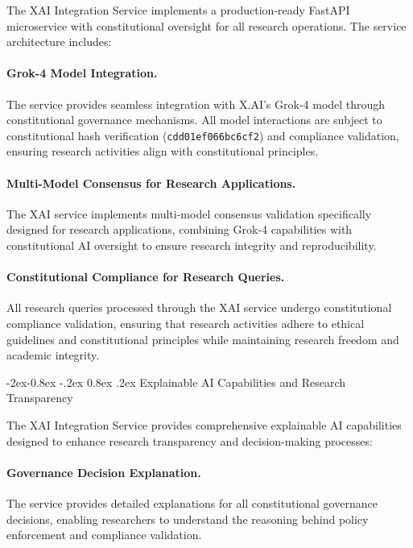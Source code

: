 \documentclass[manuscript,screen,9pt]{acmart}
\makeatletter
\renewcommand\subsubsection{\@startsection{subsubsection}{3}{\z@}%
  {-2ex\@plus -0.8ex \@minus -.2ex}%
  {0.8ex \@plus .2ex}%
  {\normalfont\normalsize\bfseries}}
\makeatother
\begin{document}
The XAI Integration Service implements a production-ready FastAPI microservice with constitutional oversight for all research operations. The service architecture includes:

\paragraph{Grok-4 Model Integration.} The service provides seamless integration with X.AI's Grok-4 model through constitutional governance mechanisms. All model interactions are subject to constitutional hash verification (\texttt{\small{cdd01ef066bc6cf2}}) and compliance validation, ensuring research activities align with constitutional principles.

\paragraph{Multi-Model Consensus for Research Applications.} The XAI service implements multi-model consensus validation specifically designed for research applications, combining Grok-4 capabilities with constitutional AI oversight to ensure research integrity and reproducibility.

\paragraph{Constitutional Compliance for Research Queries.} All research queries processed through the XAI service undergo constitutional compliance validation, ensuring that research activities adhere to ethical guidelines and constitutional principles while maintaining research freedom and academic integrity.

\subsubsection{Explainable AI Capabilities and Research Transparency}
\label{subsubsec:explainable_ai_capabilities}

The XAI Integration Service provides comprehensive explainable AI capabilities designed to enhance research transparency and decision-making processes:

\paragraph{Governance Decision Explanation.} The service provides detailed explanations for all constitutional governance decisions, enabling researchers to understand the reasoning behind policy enforcement and compliance validation.
\end{document}
